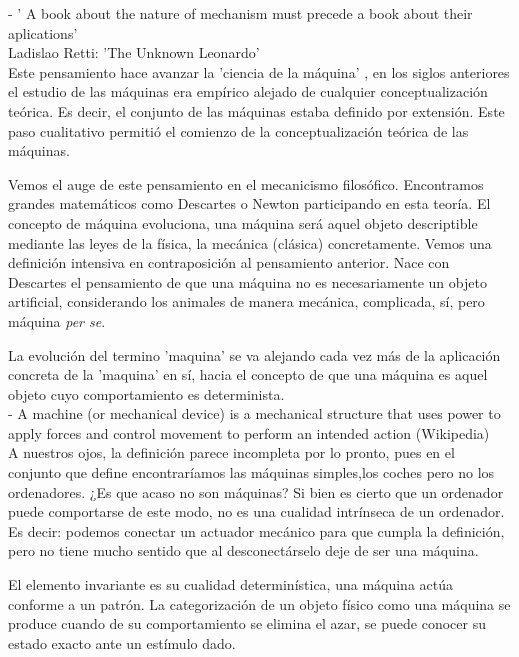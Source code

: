 - ' A book about the nature of mechanism must precede a book about their aplications' \\

Ladislao Retti: 'The Unknown Leonardo' \\

Este pensamiento hace avanzar la 'ciencia de la máquina' , en los siglos anteriores el estudio de las máquinas era empírico alejado de cualquier conceptualización teórica. Es decir, el conjunto de las máquinas estaba definido por extensión. Este paso cualitativo permitió el comienzo de la conceptualización teórica de las máquinas.

\vspace{10px}

Vemos el auge de este pensamiento en el mecanicismo filosófico. Encontramos grandes matemáticos como Descartes o Newton participando en esta teoría. El concepto de máquina evoluciona, una máquina será aquel objeto descriptible mediante las leyes de la física, la mecánica (clásica) concretamente. Vemos una definición intensiva en contraposición al pensamiento anterior. Nace con Descartes el pensamiento de que una máquina no es necesariamente un objeto artificial, considerando los animales de manera mecánica, complicada, sí, pero máquina \textit{per se}. 

\newpage

La evolución del termino 'maquina' se va alejando cada vez más de la aplicación concreta de la 'maquina' en sí, hacia el concepto de que una máquina es aquel objeto cuyo comportamiento es determinista. \\

- A machine (or mechanical device) is a mechanical structure that uses power to apply forces and control movement to perform an intended action (Wikipedia) \\

A nuestros ojos, la definición parece incompleta por lo pronto, pues en el conjunto que define encontraríamos las máquinas simples,los coches pero no los ordenadores. ¿Es que acaso no son máquinas? Si bien es cierto que un ordenador puede comportarse de este modo, no es una cualidad intrínseca de un ordenador. Es decir: podemos conectar un actuador mecánico para que cumpla la definición, pero no tiene mucho sentido que al desconectárselo deje de ser una máquina. 

\vspace{10px}

El elemento invariante es su cualidad determinística, una máquina actúa conforme a un patrón. La categorización de un objeto físico como una máquina se produce cuando de su comportamiento se elimina el azar, se puede conocer su estado exacto ante un estímulo dado.



